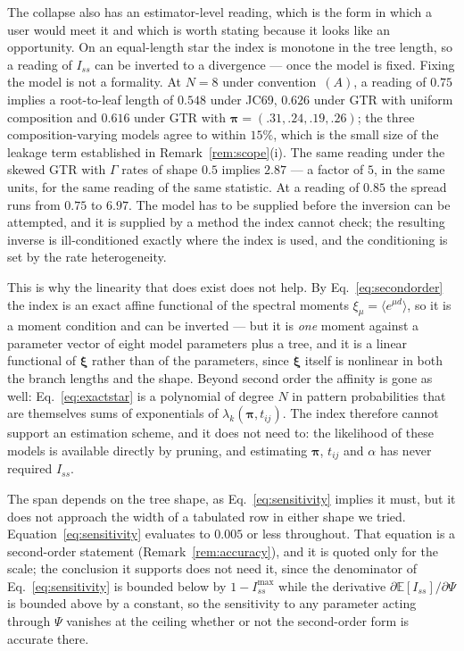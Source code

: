 \documentclass[11pt]{article}
\newcommand{\Iss}{I_{ss}}
\newcommand{\bpi}{\boldsymbol{\pi}}
\newcommand{\bxi}{\boldsymbol{\xi}}
\newcommand{\E}{\mathbb{E}}
\theoremstyle{definition}
\theoremstyle{remark}
\begin{document}
\begin{sloppypar}
The collapse also has an estimator-level reading, which is the form in which
a user would meet it and which is worth stating because it looks like an
opportunity. On an equal-length star the index is monotone in the tree
length, so a reading of $\Iss$ can be inverted to a divergence --- once the
model is fixed. Fixing the model is not a formality. At $N=8$ under
convention~$(A)$, a reading of $0.75$ implies a root-to-leaf length of
$0.548$ under JC69, $0.626$ under GTR with uniform composition and $0.616$
under GTR with $\bpi=(.31,.24,.19,.26)$; the three composition-varying models
agree to within $15\%$, which is the small size of the leakage term
established in Remark~\ref{rem:scope}(i). The same reading under the skewed
GTR with $\Gamma$ rates of shape $0.5$ implies $2.87$ --- a factor of $5$, in
the same units, for the same reading of the same statistic. At a reading of
$0.85$ the spread runs from $0.75$ to $6.97$. The model has to be supplied
before the inversion can be attempted, and it is supplied by a method the
index cannot check; the resulting inverse is ill-conditioned exactly where
the index is used, and the conditioning is set by the rate heterogeneity.

This is why the linearity that does exist does not help. By
Eq.~\eqref{eq:secondorder} the index is an exact affine functional of the
spectral moments $\xi_\mu=\langle e^{\mu d}\rangle$, so it is a moment
condition and can be inverted --- but it is \emph{one} moment against a
parameter vector of eight model parameters plus a tree, and it is a linear
functional of $\bxi$ rather than of the parameters, since $\bxi$ itself is
nonlinear in both the branch lengths and the shape. Beyond second order the
affinity is gone as well: Eq.~\eqref{eq:exactstar} is a polynomial of degree
$N$ in pattern probabilities that are themselves sums of exponentials of
$\lambda_k(\bpi,t_{ij})$. The index therefore cannot support an estimation
scheme, and it does not need to: the likelihood of these models is available
directly by pruning, and estimating $\bpi$, $t_{ij}$ and $\alpha$ has never
required $\Iss$.

The span depends on the tree shape, as
Eq.~\eqref{eq:sensitivity} implies it must, but it does not approach the
width of a tabulated row in either shape we tried.
Equation~\eqref{eq:sensitivity} evaluates to $0.005$ or less throughout. That
equation is a second-order statement (Remark~\ref{rem:accuracy}), and it is
quoted only for the scale; the conclusion it supports does not need it, since
the denominator of Eq.~\eqref{eq:sensitivity} is bounded below by
$1-\Iss^{\max}$ while the derivative $\partial\E[\Iss]/\partial\Psi$ is
bounded above by a constant, so the sensitivity to any parameter acting
through $\Psi$ vanishes at the ceiling whether or not the second-order form is
accurate there.
\end{sloppypar}
\end{document}
